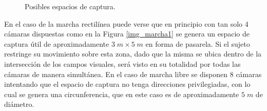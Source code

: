  
\begin{figure}[ht!]
  \centering
  \hspace{-1cm}
   \hspace{0.3cm}
     \caption{Posibles espacios de captura.}
  \label{img_espacio_capura}
\end{figure} 
 
En el caso de la marcha rectilínea puede verse que en principio con tan solo 4 cámaras dispuestas como en la Figura \ref{img_marcha1} se genera un espacio de captura útil de aproximadamente $3\;m\times5\; m$ en forma de pasarela. Si el sujeto restringe su movimiento sobre esta zona, dado que la misma se ubica dentro de la intersección de los campos visuales, será visto en su totalidad por todas las cámaras de manera simultánea. En el caso de marcha libre se disponen 8 cámaras intentando que el espacio de captura no tenga direcciones privilegiadas, con lo cual se genera una circunferencia, que en este caso es de aproximadamente $5\;m$ de diámetro. 


